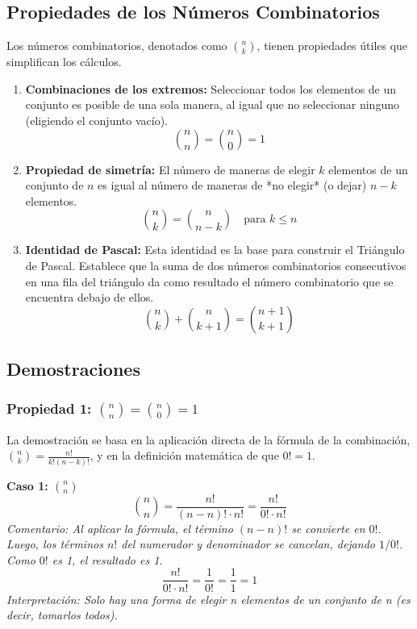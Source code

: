 \documentclass[12pt, letterpaper]{article}
\begin{document}
\subsection{Propiedades de los Números Combinatorios}
Los números combinatorios, denotados como $\binom{n}{k}$, tienen propiedades útiles que simplifican los cálculos.
\begin{enumerate}
    \item \textbf{Combinaciones de los extremos:} Seleccionar todos los elementos de un conjunto es posible de una sola manera, al igual que no seleccionar ninguno (eligiendo el conjunto vacío).
    \[ \binom{n}{n} = \binom{n}{0} = 1 \]

    \item \textbf{Propiedad de simetría:} El número de maneras de elegir $k$ elementos de un conjunto de $n$ es igual al número de maneras de *no elegir* (o dejar) $n-k$ elementos.
    \[ \binom{n}{k} = \binom{n}{n-k} \quad \text{para } k \leq n \]

    \item \textbf{Identidad de Pascal:} Esta identidad es la base para construir el Triángulo de Pascal. Establece que la suma de dos números combinatorios consecutivos en una fila del triángulo da como resultado el número combinatorio que se encuentra debajo de ellos.
    \[ \binom{n}{k} + \binom{n}{k+1} = \binom{n+1}{k+1} \]
\end{enumerate}

\subsection{Demostraciones}
\subsubsection[Propiedad 1: C(n,n) = C(n,0) = 1]{Propiedad 1: \texorpdfstring{$\binom{n}{n} = \binom{n}{0} = 1$}{C(n,n) = C(n,0) = 1}}
La demostración se basa en la aplicación directa de la fórmula de la combinación, $\binom{n}{k} = \frac{n!}{k!(n-k)!}$, y en la definición matemática de que $0! = 1$.

\vspace{1em}
\noindent \textbf{Caso 1: $\binom{n}{n}$}
\[ \binom{n}{n} = \frac{n!}{(n-n)! \cdot n!} = \frac{n!}{0! \cdot n!} \]
\textit{Comentario: Al aplicar la fórmula, el término $(n-n)!$ se convierte en $0!$. Luego, los términos $n!$ del numerador y denominador se cancelan, dejando $1/0!$. Como $0!$ es 1, el resultado es 1.}
\[ \frac{n!}{0! \cdot n!} = \frac{1}{0!} = \frac{1}{1} = 1 \]
\textit{Interpretación: Solo hay una forma de elegir n elementos de un conjunto de n (es decir, tomarlos todos).}
\end{document}
